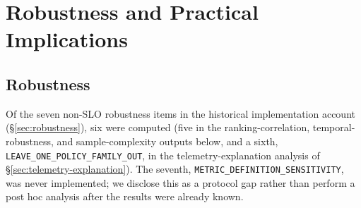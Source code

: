 \section{Robustness and Practical Implications}\label{sec:discussion}\label{sec:robustness}
\subsection{Robustness}
\label{sec:results-robustness}

Of the seven non-SLO robustness items in the historical implementation account (\S\ref{sec:robustness}), six were computed (five in the ranking-correlation, temporal-robustness, and sample-complexity outputs below, and a sixth, \texttt{LEAVE\_ONE\_POLICY\_FAMILY\_OUT}, in the telemetry-explanation analysis of \S\ref{sec:telemetry-explanation}). The seventh, \texttt{METRIC\_DEFINITION\_SENSITIVITY}, was never implemented; we disclose this as a protocol gap rather than perform a post hoc analysis after the results were already known.

